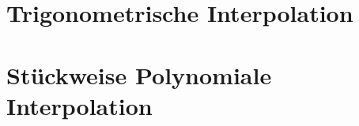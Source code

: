 \documentclass{article}
\begin{document}
\newsection
\section{Trigonometrische Interpolation}











\newsection
\section{Stückweise Polynomiale Interpolation}



\end{document}
